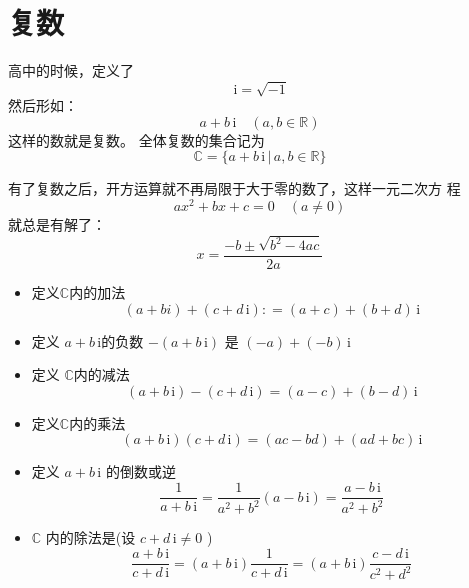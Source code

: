 \documentclass[13pt,punct]{ctexbeamer}
\def\i{\, \mathrm{i}}
\begin{document}
\section{复数}
\begin{frame}
	高中的时候，定义了
	\[
	\i=\sqrt{-1}
	\]
	然后形如：
	\[
	a+b \i \quad(a, b \in \mathbb{R})
	\]
	这样的数就是复数。
	全体复数的集合记为
	\[
	\mathbb{C}=\{a+b \i \, | \, a, b \in \mathbb{R}\}
	\]


	有了复数之后，开方运算就不再局限于大于零的数了，这样一元二次方 程
	\[
	a x^{2}+b x+c=0 \quad(a \neq 0)
	\]
	就总是有解了：
	\[
	x=\frac{-b \pm \sqrt{b^{2}-4 a c}}{2 a}
	\]


\end{frame}

\begin{frame}
	\begin{itemize}
		\item 定义$\mathbb{C}$内的加法
		$$(a+b i)+(c+d \i)  : =(a+c)+(b+d) \i $$

		\item 定义 $a+b {\i}$的负数 $-(a+b {\i})${ 是 } $(-a)+(-b) {\i}$

		\item 定义  $\mathbb{C}$内的减法 $$(a+b \i)-(c+d \i) =(a-c)+(b-d) \i $$
	\end{itemize}

\end{frame}

\begin{frame}
	\begin{itemize}
		\item 定义$\mathbb{C}$内的乘法
		\[
		(a+b \i)(c+d \i) =(a c-b d)+(a d+b c) \i
		\]

		\item 定义 $a+b {\i}$ 的倒数或逆
		\[
		\frac{1}{a+b \i}=\frac{1}{a^{2}+b^{2}}(a-b \i)=\frac{a-b \i}{a^{2}+b^{2}}
		\]
		\item  $\mathbb{C}$ 内的除法是(设 $c+d {\i} \neq 0$ )
		\[
		\frac{a+b \i}{c+d \i}=(a+b \i) \frac{1}{c+d \i}=(a+b \i) \frac{c-d \i}{c^{2}+d^{2}}
		\]
	\end{itemize}
\end{frame}
\end{document}

